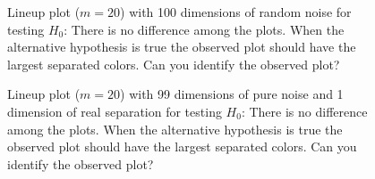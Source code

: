 \documentclass[12]{article}
\begin{document}
%
\begin{figure}[hbtp]
   \centering
       \caption{Lineup plot ($m=20$) with 100 dimensions of random noise for testing $H_0$: There is no difference among the plots. When the alternative hypothesis is true the observed plot should have the largest separated colors. Can you identify the observed plot?}
     \label{fig:test_category_1d}
\end{figure}
%
%
\begin{figure}[hbtp]
   \centering
       \caption{Lineup plot ($m=20$) with 99 dimensions of pure noise and 1 dimension of real separation for testing $H_0$: There is no difference among the plots. When the alternative hypothesis is true the observed plot should have the largest separated colors. Can you identify the observed plot?}
       \label{not_noise_1d}
\end{figure}
 
\end{document}
